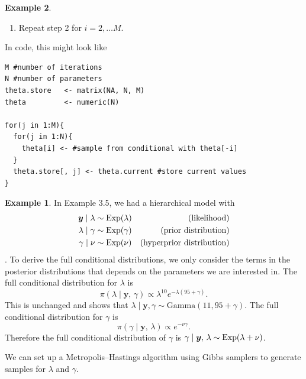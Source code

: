 \documentclass[
]{book}
\theoremstyle{definition}
\theoremstyle{definition}
\newtheorem{example}{Example}[chapter]
\theoremstyle{definition}
\theoremstyle{definition}
\theoremstyle{remark}
\begin{document}
\begin{example}
\begin{enumerate}
  Draw a value for \(\theta_1^{(i)}\) from \(\pi(\theta_1 \mid \theta_2^{(i-1)}, \ldots, \theta_N^{(i-1)})\).

  Draw a value for \(\theta_2^{(i)}\) from \(\pi(\theta_2 \mid \theta_1^{(i)}, \theta_3^{(i-1)}, \ldots, \theta_N^{(i-1)})\).

  \(\vdots\)

  Draw a value for \(\theta_N^{(i)}\) from \(\pi(\theta_N \mid \theta_1^{(i)},     \theta_2^{(i)}, \ldots, \theta_{N-1}^{(i)})\).
\item
  Repeat step 2 for \(i = 2, \ldots M\).
\end{enumerate}

In code, this might look like

\begin{verbatim}
M #number of iterations
N #number of parameters
theta.store   <- matrix(NA, N, M)
theta         <- numeric(N)

for(j in 1:M){
  for(j in 1:N){
    theta[i] <- #sample from conditional with theta[-i]
  }
  theta.store[, j] <- theta.current #store current values
}
\end{verbatim}

\begin{example}
In Example 3.5, we had a hierarchical model with\\
\begin{align*}
\boldsymbol{y} \mid \lambda &\sim \hbox{Exp}(\lambda) & \textrm{(likelihood)} \\
\lambda \mid \gamma &\sim \hbox{Exp}(\gamma) & \textrm{(prior distribution)} \\
\gamma \mid \nu &\sim \hbox{Exp}(\nu) & \textrm{(hyperprior distribution)}  \\
\end{align*}.
To derive the full conditional distributions, we only consider the terms in the posterior distributions that depends on the parameters we are interested in. The full conditional distribution for \(\lambda\) is
\[
\pi(\lambda \mid \boldsymbol{y}, \,\gamma) \propto \lambda^{10}e^{-\lambda(95 + \gamma)}.
\]
This is unchanged and shows that \(\lambda \mid \boldsymbol{y}, \gamma \sim \textrm{Gamma}(11, 95 + \gamma)\). The full conditional distribution for \(\gamma\) is
\[
\pi(\gamma \mid \boldsymbol{y}, \,\lambda) \propto e^{-\nu\gamma}.
\]
Therefore the full conditional distribution of \(\gamma\) is \(\gamma \mid \boldsymbol{y}, \,\lambda \sim \hbox{Exp}(\lambda + \nu)\).

We can set up a Metropolis--Hastings algorithm using Gibbs samplers to generate samples for \(\lambda\) and \(\gamma\).


\end{example}
\end{example}
\end{document}
